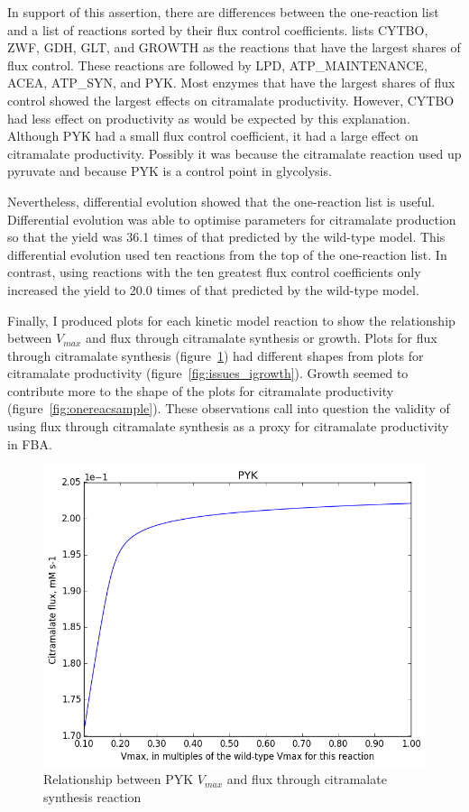\documentclass[parskip=full, numbers=noenddot]{scrreprt}
\begin{document}
In support of this assertion, there are differences between the one-reaction list and a list of reactions sorted by their flux control coefficients.
\citet{millard_metabolic_2017} lists CYTBO, ZWF, GDH, GLT, and GROWTH as the reactions that have the largest shares of flux control. These reactions are followed by LPD, ATP\_MAINTENANCE, ACEA, ATP\_SYN, and PYK. Most enzymes that have the largest shares of flux control showed the largest effects on citramalate productivity. However, CYTBO had less effect on productivity as would be expected by this explanation. Although PYK had a small flux control coefficient, it had a large effect on citramalate productivity. Possibly it was because the citramalate reaction used up pyruvate and because PYK is a control point in glycolysis.

Nevertheless, differential evolution showed that the one-reaction list is useful.
Differential evolution was able to optimise parameters for citramalate production so that the yield was 36.1 times of that predicted by the wild-type model. This differential evolution used ten reactions from the top of the one-reaction list. In contrast, using reactions with the ten greatest flux control coefficients only increased the yield to 20.0 times of that predicted by the wild-type model.

Finally, I produced plots for each kinetic model reaction to show the relationship between $V_{max}$ and flux through citramalate synthesis or growth.
Plots for flux through citramalate synthesis (figure~\ref{fig:issues_citraflux}) had different shapes from plots for citramalate productivity (figure~\ref{fig:issues_igrowth}). Growth seemed to contribute more to the shape of the plots for citramalate productivity (figure~\ref{fig:onereacsample}). These observations call into question the validity of using flux through citramalate synthesis as a proxy for citramalate productivity in FBA.

\begin{figure}[h]
  \centering
  \includegraphics[scale=0.4]{issues_citraflux}
  \caption{Relationship between PYK $V_{max}$ and flux through citramalate synthesis reaction}
  \label{fig:issues_citraflux}
\end{figure}
\end{document}
